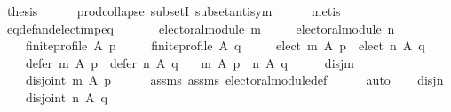 \begin{isabellebody}
\ {\isacharquery}{\kern0pt}thesis\isanewline
\ \ \ \ \isamarkupfalse%
\ prod{\isachardot}{\kern0pt}collapse\ subsetI\ subset{\isacharunderscore}{\kern0pt}antisym\isanewline
\ \ \ \ \isamarkupfalse%
\ metis\isanewline
{}\isamarkupfalse%
%
\endisatagproof
{\isafoldproof}%
%
\isadelimproof
\isanewline
%
\endisadelimproof
\isanewline
{}\isamarkupfalse%
\ eq{\isacharunderscore}{\kern0pt}def{\isacharunderscore}{\kern0pt}and{\isacharunderscore}{\kern0pt}elect{\isacharunderscore}{\kern0pt}imp{\isacharunderscore}{\kern0pt}eq{\isacharcolon}{\kern0pt}\isanewline
\ \ \isanewline
\ \ \ \ {\isachardoublequoteopen}electoral{\isacharunderscore}{\kern0pt}module\ m{\isachardoublequoteclose}\ \isanewline
\ \ \ \ {\isachardoublequoteopen}electoral{\isacharunderscore}{\kern0pt}module\ n{\isachardoublequoteclose}\ \isanewline
\ \ \ \ {\isachardoublequoteopen}finite{\isacharunderscore}{\kern0pt}profile\ A\ p{\isachardoublequoteclose}\ \isanewline
\ \ \ \ {\isachardoublequoteopen}finite{\isacharunderscore}{\kern0pt}profile\ A\ q{\isachardoublequoteclose}\ \isanewline
\ \ \ \ {\isachardoublequoteopen}elect\ m\ A\ p\ {\isacharequal}{\kern0pt}\ elect\ n\ A\ q{\isachardoublequoteclose}\ \isanewline
\ \ \ \ {\isachardoublequoteopen}defer\ m\ A\ p\ {\isacharequal}{\kern0pt}\ defer\ n\ A\ q{\isachardoublequoteclose}\isanewline
\ \ \ {\isachardoublequoteopen}m\ A\ p\ {\isacharequal}{\kern0pt}\ n\ A\ q{\isachardoublequoteclose}\isanewline
%
\isadelimproof
%
\endisadelimproof
%
\isatagproof
{}\isamarkupfalse%
\ {\isacharminus}{\kern0pt}\isanewline
\ \ \isamarkupfalse%
\ disj{\isacharunderscore}{\kern0pt}m{\isacharcolon}{\kern0pt}\isanewline
\ \ \ \ {\isachardoublequoteopen}disjoint{}\ {\isacharparenleft}{\kern0pt}m\ A\ p{\isacharparenright}{\kern0pt}{\isachardoublequoteclose}\isanewline
\ \ \ \ \isamarkupfalse%
\ assms{\isacharparenleft}{\kern0pt}{}{\isacharparenright}{\kern0pt}\ assms{\isacharparenleft}{\kern0pt}{}{\isacharparenright}{\kern0pt}\ electoral{\isacharunderscore}{\kern0pt}module{\isacharunderscore}{\kern0pt}def\isanewline
\ \ \ \ \isamarkupfalse%
\ auto\isanewline
\ \ \isamarkupfalse%
\ disj{\isacharunderscore}{\kern0pt}n{\isacharcolon}{\kern0pt}\isanewline
\ \ \ \ {\isachardoublequoteopen}disjoint{}\ {\isacharparenleft}{\kern0pt}n\ A\ q{\isacharparenright}{\kern0pt}{\isachardoublequoteclose}\isanewline

\end{isabellebody}
